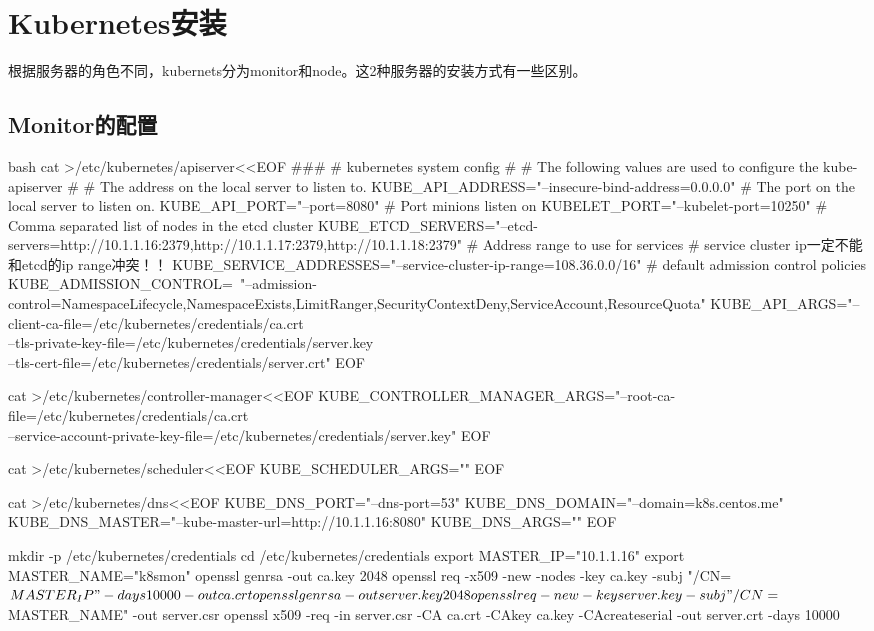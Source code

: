 \begin{outline}[enumerate]
\end{outline}

\section{Kubernetes安装}
根据服务器的角色不同，kubernets分为monitor和node。这2种服务器的安装方式有一些区别。

\subsection{Monitor的配置}
\begin{code-block}{bash}
cat >/etc/kubernetes/apiserver<<EOF
###
# kubernetes system config
#
# The following values are used to configure the kube-apiserver
#
# The address on the local server to listen to.
KUBE_API_ADDRESS="--insecure-bind-address=0.0.0.0"
# The port on the local server to listen on.
KUBE_API_PORT="--port=8080"
# Port minions listen on
KUBELET_PORT="--kubelet-port=10250"
# Comma separated list of nodes in the etcd cluster
KUBE_ETCD_SERVERS="--etcd-servers=http://10.1.1.16:2379,http://10.1.1.17:2379,http://10.1.1.18:2379"
# Address range to use for services
# service cluster ip一定不能和etcd的ip range冲突！！
KUBE_SERVICE_ADDRESSES="--service-cluster-ip-range=108.36.0.0/16"
# default admission control policies
KUBE_ADMISSION_CONTROL=\
"--admission-control=NamespaceLifecycle,NamespaceExists,LimitRanger,SecurityContextDeny,ServiceAccount,ResourceQuota"
KUBE_API_ARGS="--client-ca-file=/etc/kubernetes/credentials/ca.crt \\
               --tls-private-key-file=/etc/kubernetes/credentials/server.key \\
               --tls-cert-file=/etc/kubernetes/credentials/server.crt"
EOF

cat >/etc/kubernetes/controller-manager<<EOF
KUBE_CONTROLLER_MANAGER_ARGS="--root-ca-file=/etc/kubernetes/credentials/ca.crt \\
    --service-account-private-key-file=/etc/kubernetes/credentials/server.key"
EOF

cat >/etc/kubernetes/scheduler<<EOF
KUBE_SCHEDULER_ARGS=""
EOF

cat >/etc/kubernetes/dns<<EOF
KUBE_DNS_PORT="--dns-port=53"
KUBE_DNS_DOMAIN="--domain=k8s.centos.me"
KUBE_DNS_MASTER="--kube-master-url=http://10.1.1.16:8080"
KUBE_DNS_ARGS=""
EOF

mkdir -p /etc/kubernetes/credentials
cd /etc/kubernetes/credentials
export MASTER_IP="10.1.1.16"
export MASTER_NAME="k8smon"
openssl genrsa -out ca.key 2048
openssl req -x509 -new -nodes -key ca.key -subj "/CN=${MASTER_IP}" -days 10000 -out ca.crt
openssl genrsa -out server.key 2048
openssl req -new -key server.key -subj "/CN=${MASTER_NAME}" -out server.csr
openssl x509 -req -in server.csr -CA ca.crt -CAkey ca.key -CAcreateserial -out server.crt -days 10000


\end{code-block}
